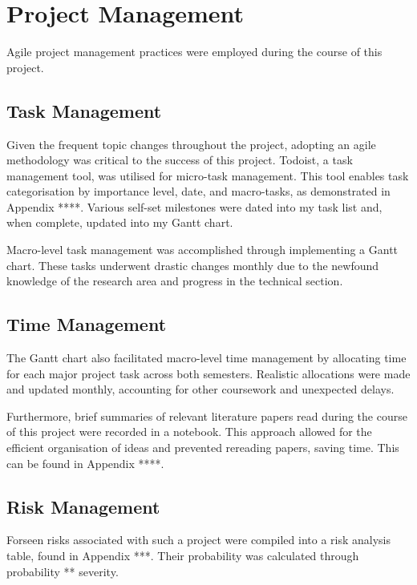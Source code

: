 

\section {Project Management}

Agile project management practices were employed during the course of this project. 

\subsection{Task Management}

Given the frequent topic changes throughout the project, adopting an agile methodology was critical to the success of this project. Todoist, a task management tool, was utilised for micro-task management. This tool enables task categorisation by importance level, date, and macro-tasks,  as demonstrated in Appendix ****. Various self-set milestones were dated into my task list and, when complete, updated into my Gantt chart.

Macro-level task management was accomplished through implementing a Gantt chart. These tasks underwent drastic changes monthly due to the newfound knowledge of the research area and progress in the technical section. 

\subsection{Time Management}

The Gantt chart also facilitated macro-level time management by allocating time for each major project task across both semesters. Realistic allocations were made and updated monthly, accounting for other coursework and unexpected delays. 

Furthermore, brief summaries of relevant literature papers read during the course of this project were recorded in a notebook. This approach allowed for the efficient organisation of ideas and prevented rereading papers, saving time. This can be found in Appendix ****.

\subsection{Risk Management}

Forseen risks associated with such a project were compiled into a risk analysis table, found in Appendix ***. Their probability was calculated through probability ** severity.

